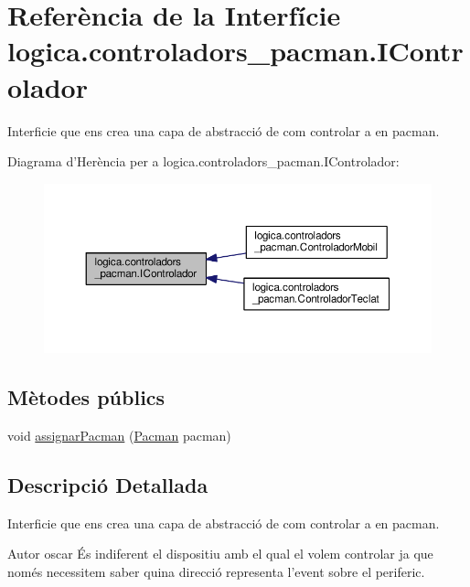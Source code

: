 \hypertarget{interfacelogica_1_1controladors__pacman_1_1_i_controlador}{\section{Referència de la Interfície logica.\+controladors\+\_\+pacman.\+I\+Controlador}
\label{interfacelogica_1_1controladors__pacman_1_1_i_controlador}
}


Interficie que ens crea una capa de abstracció de com controlar a en pacman.  




Diagrama d'Herència per a logica.\+controladors\+\_\+pacman.\+I\+Controlador\+:\nopagebreak
\begin{figure}[H]
\begin{center}
\leavevmode
\includegraphics[width=350pt]{interfacelogica_1_1controladors__pacman_1_1_i_controlador__inherit__graph}
\end{center}
\end{figure}
\subsection*{Mètodes públics}
\begin{DoxyCompactItemize}
\item 
void \hyperlink{interfacelogica_1_1controladors__pacman_1_1_i_controlador_ac765182730a4337c576a9764cdd521fa}{assignar\+Pacman} (\hyperlink{classlogica_1_1_pacman}{Pacman} pacman)
\end{DoxyCompactItemize}


\subsection{Descripció Detallada}
Interficie que ens crea una capa de abstracció de com controlar a en pacman. 

\begin{DoxyAuthor}{Autor}
oscar És indiferent el dispositiu amb el qual el volem controlar ja que només necessitem saber quina direcció representa l'event sobre el periferic. 
\end{DoxyAuthor}


